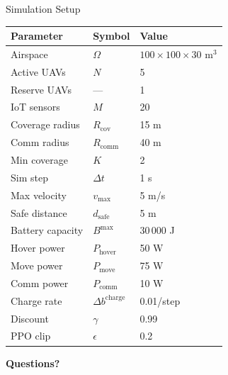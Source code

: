 \documentclass[aspectratio=169,12pt]{beamer}
\begin{document}
\begin{frame}{Simulation Setup}
\begin{center}
\begin{tabular}{@{}lll@{}}
\toprule
\textbf{Parameter} & \textbf{Symbol} & \textbf{Value} \\
\midrule
Airspace & $\Omega$ & $100 \times 100 \times 30$ m$^3$ \\
Active UAVs & $N$ & 5 \\
Reserve UAVs & --- & 1 \\
IoT sensors & $M$ & 20 \\
Coverage radius & $R_{\text{cov}}$ & 15 m \\
Comm radius & $R_{\text{comm}}$ & 40 m \\
Min coverage & $K$ & 2 \\
Sim step & $\Delta t$ & 1 s \\
Max velocity & $v_{\max}$ & 5 m/s \\
Safe distance & $d_{\text{safe}}$ & 5 m \\
Battery capacity & $B^{\max}$ & 30\,000 J \\
Hover power & $P_{\text{hover}}$ & 50 W \\
Move power & $P_{\text{move}}$ & 75 W \\
Comm power & $P_{\text{comm}}$ & 10 W \\
Charge rate & $\Delta b^{\text{charge}}$ & 0.01/step \\
Discount & $\gamma$ & 0.99 \\
PPO clip & $\epsilon$ & 0.2 \\
\bottomrule
\end{tabular}
\end{center}
\end{frame}

\begin{frame}
\begin{center}
\vspace{1.5em}
\Large\textbf{Questions?}
\end{center}
\end{frame}
\end{document}
